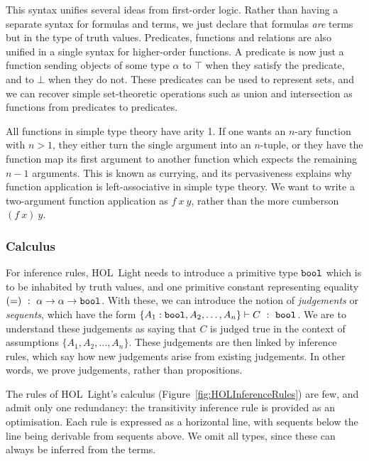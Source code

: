 This syntax unifies several ideas from first-order logic. Rather than having a separate syntax for formulas and terms, we just declare that formulas \emph{are} terms but in the type of truth values. Predicates, functions and relations are also unified in a single syntax for higher-order functions. A predicate is now just a function sending objects of some type $\alpha$ to $\top$ when they satisfy the predicate, and to $\bot$ when they do not. These predicates can be used to represent sets, and we can recover simple set-theoretic operations such as union and intersection as functions from predicates to predicates.

All functions in simple type theory have arity 1. If one wants an $n$-ary function with \mbox{$n>1$}, they either turn the single argument into an $n$-tuple, or they have the function map its first argument to another function which expects the remaining $n-1$ arguments. This is known as currying, and its pervasiveness explains why function application is left-associative in simple type theory. We want to write a two-argument function application as $f\ x\ y$, rather than the more cumberson $(f\ x)\ y$.

\subsubsection{Calculus}\label{sec:HOLInferenceRules}
For inference rules, HOL~Light needs to introduce a primitive type $\texttt{bool}$ which is to be inhabited by truth values, and one primitive constant representing equality \linebreak$(=)\ :\ \alpha \rightarrow \alpha \rightarrow \texttt{bool}$. With these, we can introduce the notion of \emph{judgements} or \emph{sequents}, which have the form $\{A_1:\code{bool},A_2,\ldots,A_n\} \vdash C\ :\ \code{bool}$. We are to understand these judgements as saying that $C$ is judged true in the context of assumptions $\{A_1,A_2,\ldots,A_n\}$. These judgements are then linked by inference rules, which say how new judgements arise from existing judgements. In other words, we prove judgements, rather than propositions.

The rules of HOL~Light's calculus (Figure~\ref{fig:HOLInferenceRules}) are few, and admit only one redundancy: the transitivity inference rule is provided as an optimisation. Each rule is expressed as a horizontal line, with sequents below the line being derivable from sequents above. We omit all types, since these can always be inferred from the terms.


